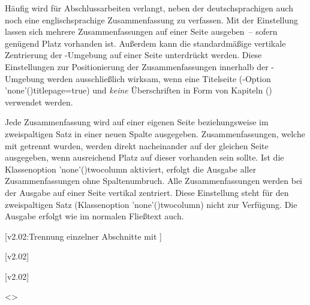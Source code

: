 \begin{DeclareEntity*}{}
\begin{DeclareEntity*}{}
\begin{DeclareEntity*}{}
\begin{Declaration}
Häufig wird für Abschlussarbeiten verlangt, neben der deutschsprachigen auch 
noch eine englischsprachige Zusammenfassung zu verfassen. Mit der Einstellung 
 lassen sich mehrere Zusammenfassungen auf einer 
Seite ausgeben~-- sofern genügend Platz vorhanden ist. Außerdem kann die 
standardmäßige vertikale Zentrierung der -Umgebung 
auf einer Seite unterdrückt werden. Diese Einstellungen zur Positionierung der 
Zusammenfassungen innerhalb der -Umgebung werden 
ausschließlich wirksam, wenn eine Titelseite 
(\KOMAScript-Option \Option'none'(){titlepage=true}) und 
\emph{keine} Überschriften in Form von Kapiteln () 
verwendet werden.
\begin{DeclareValues}{}
  Jede Zusammenfassung wird auf einer eigenen Seite
  beziehungsweise im zweispaltigen Satz in einer neuen Spalte ausgegeben.
  Zusammenfassungen, welche mit  getrennt wurden, werden 
  direkt nacheinander auf der gleichen Seite ausgegeben, wenn ausreichend Platz 
  auf dieser vorhanden sein sollte. Ist die Klassenoption 
  \Option'none'(){twocolumn} aktiviert, erfolgt die Ausgabe 
  aller Zusammenfassungen ohne Spaltenumbruch.
  Alle Zusammenfassungen werden bei der Ausgabe auf einer Seite vertikal 
  zentriert. Diese Einstellung steht für den zweispaltigen Satz
  (Klassenoption \Option'none'(){twocolumn}) nicht zur 
  Verfügung.
  Die Ausgabe erfolgt wie im normalen Fließtext auch.
\end{DeclareValues}
\end{Declaration}

\begin{Declaration}
  {}
  [v2.02:Trennung einzelner Abschnitte mit ]
\begin{Declaration}
  {}
\begin{Declaration}
  {}
\begin{Declaration}
  {}
  [v2.02]
\begin{Declaration}
  {}
  [v2.02]
\begin{Declaration}
  {}
\begin{Declaration}
  {}
  <>
\printdeclarationlist


\end{Declaration}
\end{Declaration}
\end{Declaration}
\end{Declaration}
\end{Declaration}
\end{Declaration}
\end{Declaration}
\end{DeclareEntity*}
\end{DeclareEntity*}
\end{DeclareEntity*}
